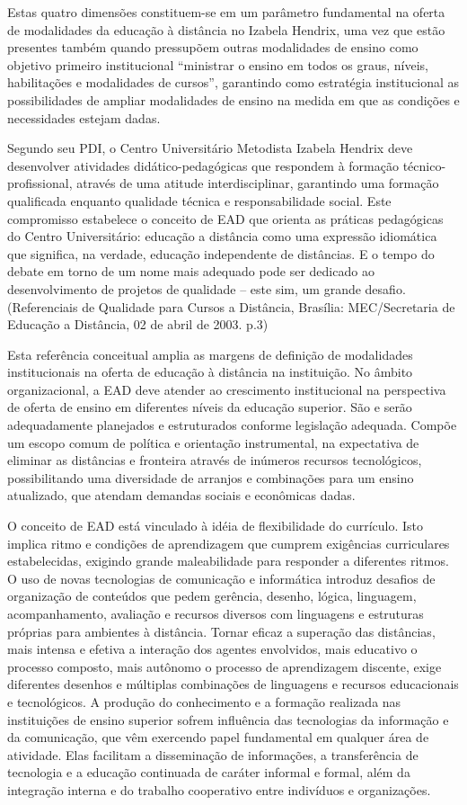 \documentclass[a4paper, 12pt, openright, oneside, german, french, english, brazil]{abntex2}
\begin{document}
Estas quatro dimensões constituem-se em um parâmetro fundamental na oferta de modalidades da educação à distância no Izabela Hendrix, uma vez que estão presentes também quando pressupõem outras modalidades de ensino como objetivo primeiro institucional “ministrar o ensino em todos os graus, níveis, habilitações e modalidades de cursos”, garantindo como estratégia institucional as possibilidades de ampliar modalidades de ensino na medida em que as condições e necessidades estejam dadas.

Segundo seu PDI, o Centro Universitário Metodista Izabela Hendrix deve desenvolver atividades didático-pedagógicas que respondem à formação técnico-profissional, através de uma atitude interdisciplinar, garantindo uma formação qualificada enquanto qualidade técnica e responsabilidade social. Este compromisso estabelece o conceito de EAD que orienta as práticas pedagógicas do Centro Universitário: educação a distância como uma expressão idiomática que significa, na verdade, educação independente de distâncias. E o tempo do debate em torno de um nome mais adequado pode ser dedicado ao desenvolvimento de projetos de qualidade – este sim, um grande desafio. (Referenciais de Qualidade para Cursos a Distância, Brasília: MEC/Secretaria de Educação a Distância, 02 de abril de 2003. p.3)

Esta referência conceitual amplia as margens de definição de modalidades institucionais na oferta de educação à distância na instituição. No âmbito organizacional, a EAD deve atender ao crescimento institucional na perspectiva de oferta de ensino em diferentes níveis da educação superior. São e serão adequadamente planejados e estruturados conforme legislação adequada. Compõe um escopo comum de política e orientação instrumental, na expectativa de eliminar as distâncias e fronteira através de inúmeros recursos tecnológicos, possibilitando uma diversidade de arranjos e combinações para um ensino atualizado, que atendam demandas sociais e econômicas dadas.

O conceito de EAD está vinculado à idéia de flexibilidade do currículo. Isto implica ritmo e condições de aprendizagem que cumprem exigências curriculares estabelecidas, exigindo grande maleabilidade para responder a diferentes ritmos. O uso de novas tecnologias de comunicação e informática introduz desafios de organização de conteúdos que pedem gerência, desenho, lógica, linguagem, acompanhamento, avaliação e recursos diversos com linguagens e estruturas próprias para ambientes à distância. Tornar eficaz a superação das distâncias, mais intensa e efetiva a interação dos agentes envolvidos, mais educativo o processo composto, mais autônomo o processo de aprendizagem discente, exige diferentes desenhos e múltiplas combinações de linguagens e recursos educacionais e tecnológicos. A produção do conhecimento e a formação realizada nas instituições de ensino superior sofrem influência das tecnologias da informação e da comunicação, que vêm exercendo papel fundamental em qualquer área de atividade. Elas facilitam a disseminação de informações, a transferência de tecnologia e a educação continuada de caráter informal e formal, além da integração interna e do trabalho cooperativo entre indivíduos e organizações.
\end{document}
